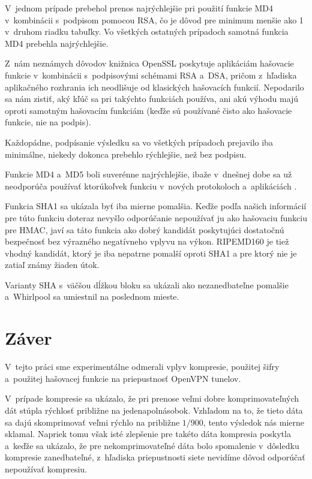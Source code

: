 \documentclass[12pt,a4paper]{article}
\begin{document}
V~jednom prípade prebehol prenos najrýchlejšie pri použití funkcie MD4
v~kombinácii s~podpisom pomocou RSA, čo je dôvod pre minimum menšie ako 1
v~druhom riadku tabuľky. Vo všetkých ostatných prípadoch samotná funkcia
MD4 prebehla najrýchlejšie.

Z~nám neznámych dôvodov knižnica OpenSSL poskytuje aplikáciám hašovacie
funkcie v~kombinácii s~podpisovými schémami RSA a~DSA, pričom z~hľadiska
aplikačného rozhrania ich neodlišuje od klasických hašovacích funkcií.
Nepodarilo sa nám zistiť, aký kľúč sa pri takýchto funkciách používa, ani
akú výhodu majú oproti samotným hašovacím funkciám (keďže sú používané
čisto ako hašovacie funkcie, nie na podpis).

Každopádne, podpísanie výsledku sa vo všetkých prípadoch prejavilo iba
minimálne, niekedy dokonca prebehlo rýchlejšie, než bez podpisu.

Funkcie MD4 a~MD5 boli suverénne najrýchlejšie, ibaže v~dnešnej dobe sa
už neodporúča používať ktorúkoľvek funkciu v~nových protokoloch
a~aplikáciách \cite{rfc-md4-obsolete, rfc-hmac-md5}.

Funkcia SHA1 sa ukázala byť iba mierne pomalšia. Keďže podľa našich
informácií pre túto funkciu doteraz nevyšlo odporúčanie nepoužívať ju ako
hašovaciu funkciu pre HMAC, javí sa táto funkcia ako dobrý kandidát
poskytujúci dostatočnú bezpečnosť bez výrazného negatívneho vplyvu na
výkon. RIPEMD160 je tiež vhodný kandidát, ktorý je iba nepatrne pomalší
oproti SHA1 a pre ktorý nie je zatiaľ známy žiaden útok.

Varianty SHA s~väčšou dĺžkou bloku sa ukázali ako nezanedbateľne pomalšie
a~Whirlpool sa umiestnil na poslednom mieste.

\section{Záver}

V~tejto práci sme experimentálne odmerali vplyv kompresie, použitej šifry
a~použitej hašovacej funkcie na priepustnosť OpenVPN tunelov.

V~prípade kompresie sa ukázalo, že pri prenose veľmi dobre komprimovateľných
dát stúpla rýchlosť približne na jedenapolnásobok. Vzhľadom na to, že
tieto dáta sa dajú skomprimovať veľmi rýchlo na približne $1/900$, tento
výsledok nás mierne sklamal. Napriek tomu však isté zlepšenie pre takéto
dáta kompresia poskytla a~keďže sa ukázalo, že pre nekomprimovateľné dáta
bolo spomalenie v~dôsledku kompresie zanedbateľné, z~hľadiska
priepustnosti siete nevidíme dôvod odporúčať nepoužívať kompresiu.
\end{document}
